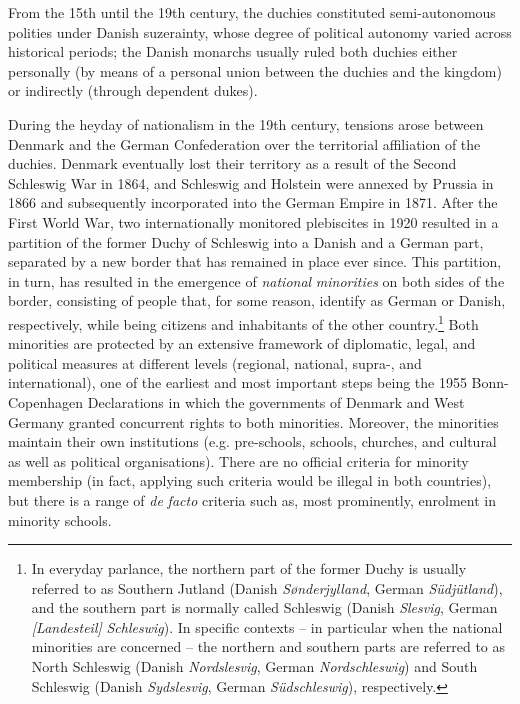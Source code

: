 \documentclass[output=paper]{langsci/langscibook}
\begin{document}
From the 15th until the 19th century, the duchies constituted semi-autonomous polities under Danish suzerainty, whose degree of political autonomy varied across historical periods; the Danish monarchs usually ruled both duchies either personally (by means of a personal union between the duchies and the kingdom) or indirectly (through dependent dukes).

During the heyday of nationalism in the 19th century, tensions arose between Denmark and the German Confederation over the territorial affiliation of the duchies. Denmark eventually lost their territory as a result of the Second Schleswig War in 1864, and Schleswig and Holstein were annexed by Prussia in 1866 and subsequently incorporated into the German Empire in 1871. After the First World War, two internationally monitored plebiscites in 1920 resulted in a partition of the former Duchy of Schleswig into a Danish and a German part, separated by a new border that has remained in place ever since. This partition, in turn, has resulted in the emergence of \textit{national} \textit{minorities} on both sides of the border, consisting of people that, for some reason, identify as German or Danish, respectively, while being citizens and inhabitants of the other country.\footnote{In everyday parlance, the northern part of the former Duchy is usually referred to as Southern Jutland (Danish \textit{Sønderjylland}, German \textit{Südjütland}), and the southern part is normally called Schleswig (Danish \textit{Slesvig}, German \textit{[Landesteil]} \textit{Schleswig}). In specific contexts – in particular when the national minorities are concerned – the northern and southern parts are referred to as North Schleswig (Danish \textit{Nordslesvig}, German \textit{Nordschleswig}) and South Schleswig (Danish \textit{Sydslesvig}, German \textit{Südschleswig}), respectively.} Both minorities are protected by an extensive framework of diplomatic, legal, and political measures at different levels (regional, national, supra-, and international), one of the earliest and most important steps being the 1955 Bonn-Copenhagen Declarations in which the governments of Denmark and West Germany granted concurrent rights to both minorities. Moreover, the minorities maintain their own institutions (e.g. pre-schools, schools, churches, and cultural as well as political organisations). There are no official criteria for minority membership (in fact, applying such criteria would be illegal in both countries), but there is a range of \textit{de} \textit{facto} criteria such as, most prominently, enrolment in minority schools.
\end{document}

